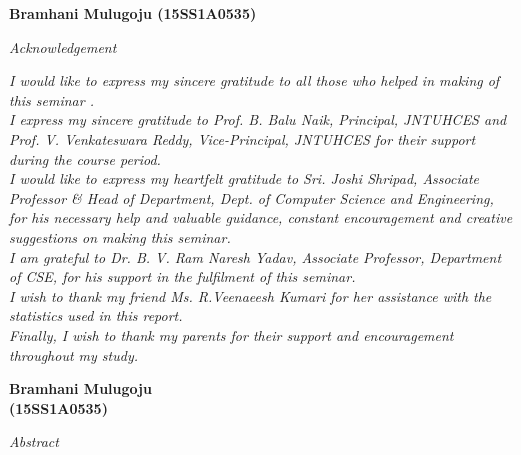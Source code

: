 \documentclass[12pt,a4paper]{report}
\begin{document}
\vspace{2in}
\begin{flushright}
\textbf{	Bramhani Mulugoju \hspace{0.5in} (15SS1A0535)} \\
\end{flushright}


\newpage %
\begin{center}
\emph{\LARGE Acknowledgement}\\[1cm]
\end{center}

\textit{I would like to express my sincere gratitude to all those who helped in making of this seminar .}\\

\textit{I express my sincere gratitude to Prof. B. Balu Naik, Principal, JNTUHCES and Prof. V. Venkateswara Reddy, Vice-Principal, JNTUHCES for their support during the course period.}\\

\textit{I would like to express my heartfelt gratitude to Sri. Joshi Shripad, Associate Professor \& Head of Department, Dept. of Computer Science and Engineering, for his necessary help and valuable guidance, constant encouragement and creative suggestions on making this seminar.}\\

\textit{I am grateful to Dr. B. V. Ram Naresh Yadav, Associate Professor, Department of CSE, for his support in the fulfilment of this seminar.}\\

\textit{I wish to thank my friend Ms. R.Veenaeesh Kumari for her assistance with the statistics used	in this report.}\\

\textit{Finally, I wish to thank my parents for their support and encouragement throughout my study.}\\

\vspace{1in}
\begin{flushright}
	\textbf{Bramhani Mulugoju} \\  \textbf{(15SS1A0535)}
\end{flushright}

\newpage
{}
\begin{center}
\emph{\LARGE Abstract}\\[1cm]
\end{center}
\end{document}
